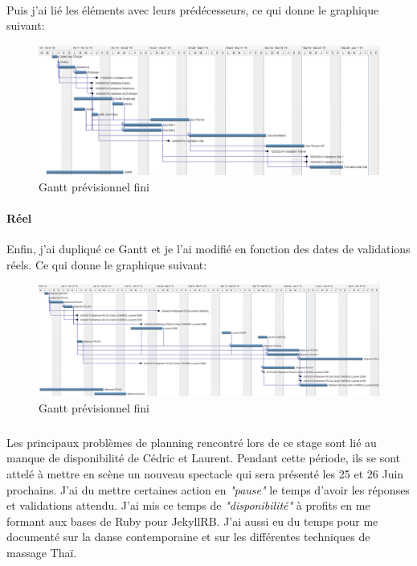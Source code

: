 \documentclass[11pt,a4paper]{report}
\begin{document}
			\paragraph*{}Puis j'ai lié les éléments avec leurs prédécesseurs, ce qui donne le graphique suivant: 

				\begin{figure}[H]
					\centering
					\includegraphics[width=\textwidth]{Gantt_Previsionnel_2.eps}
					\caption{Gantt prévisionnel fini}
					\label{fig:Graphique Gantt Previsionnel}
				\end{figure}
			\paragraph*{Réel}Enfin, j'ai dupliqué ce Gantt et je l'ai modifié en fonction des dates de validations réels. Ce qui donne le graphique suivant: 

				\begin{figure}[H]
					\centering
					\includegraphics[width=\textwidth]{Gantt_Reel_2.eps}
					\caption{Gantt prévisionnel fini}
					\label{fig:Gantt Reel}
				\end{figure}
				\subparagraph*{}Les principaux problèmes de planning rencontré lors de ce stage sont lié au manque de disponibilité de Cédric et Laurent. Pendant cette période, ils se sont attelé à mettre en scène un nouveau spectacle qui sera présenté les 25 et 26 Juin prochains. J'ai du mettre certaines action en \textit{"pause"} le temps d'avoir les réponses et validations attendu. J'ai mis ce temps de \textit{"disponibilité"} à profits en me formant aux bases de Ruby pour JekyllRB. J'ai aussi eu du temps pour me documenté sur la danse contemporaine et sur les différentes techniques de massage Thaï.
				\newpage
\end{document}
